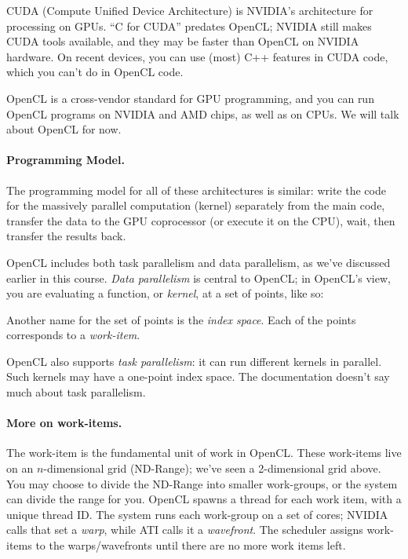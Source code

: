 \documentclass[a4paper]{report}
\begin{document}
CUDA (Compute Unified Device Architecture) is NVIDIA's architecture
for processing on GPUs. ``C for CUDA'' predates OpenCL; NVIDIA still
makes CUDA tools available, and they may be faster than OpenCL on NVIDIA
hardware. On recent devices, you can use (most) C++ features in CUDA code,
which you can't do in OpenCL code.

OpenCL is a cross-vendor standard for GPU programming, and you can run
OpenCL programs on NVIDIA and AMD chips, as well as on CPUs. We will talk
about OpenCL for now.

\paragraph{Programming Model.} The programming
model for all of these architectures is similar: write the code for
the massively parallel computation (kernel) separately from the main
code, transfer the data to the GPU coprocessor (or execute it on the
CPU), wait, then transfer the results back.

OpenCL includes both task parallelism and data parallelism, as we've
discussed earlier in this course. \emph{Data parallelism} is central to
OpenCL; in OpenCL's view, you are evaluating a function, or \emph{kernel},
at a set of points, like so:

\begin{center}
\end{center}

Another name for the set of points is the \emph{index space}. 
Each of the points corresponds to a \emph{work-item}.

OpenCL also supports \emph{task parallelism}: it can run different
kernels in parallel. Such kernels may have a one-point index space.
The documentation doesn't say much about task parallelism.

\paragraph{More on work-items.} The work-item is the fundamental
unit of work in OpenCL. These work-items live on an $n$-dimensional
grid (ND-Range); we've seen a 2-dimensional grid above. You may choose
to divide the ND-Range into smaller work-groups, or the system can
divide the range for you. OpenCL spawns a thread for each work item,
with a unique thread ID. The system runs each work-group on a set of
cores; NVIDIA calls that set a \emph{warp}, while ATI calls it a
\emph{wavefront}. The scheduler assigns work-items to the
warps/wavefronts until there are no more work items left.
\end{document}
